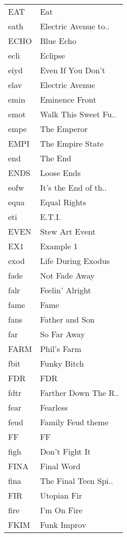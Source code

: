 \begin{supertabular}{ll}
  EAT &                   Eat \\
 eath &  Electric Avenue to.. \\
 ECHO &             Blue Echo \\
 ecli &               Eclipse \\
 eiyd &     Even If You Don't \\
 elav &       Electric Avenue \\
 emin &        Eminence Front \\
 emot &  Walk This Sweet Fu.. \\
 empe &           The Emperor \\
 EMPI &      The Empire State \\
  end &               The End \\
 ENDS &            Loose Ends \\
 eofw &  It's the End of th.. \\
 equa &          Equal Rights \\
  eti &                E.T.I. \\
 EVEN &        Stew Art Event \\
  EX1 &             Example 1 \\
 exod &    Life During Exodus \\
 fade &         Not Fade Away \\
 falr &       Feelin' Alright \\
 fame &                  Fame \\
 fans &        Father and Son \\
  far &           So Far Away \\
 FARM &           Phil's Farm \\
 fbit &           Funky Bitch \\
  FDR &                   FDR \\
 fdtr &  Farther Down The R.. \\
 fear &              Fearless \\
 feud &     Family Feud theme \\
   FF &                    FF \\
 figh &        Don't Fight It \\
 FINA &            Final Word \\
 fina &  The Final Teen Spi.. \\
  FIR &           Utopian Fir \\
 fire &           I'm On Fire \\
 FKIM &           Funk Improv \\

\end{supertabular}
